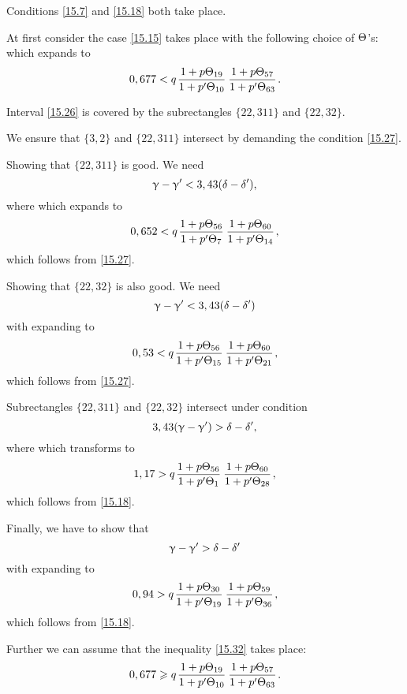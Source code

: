 Conditions \ref{15.7} and \ref{15.18} both take place.

At first consider the case \ref{15.15} takes place with the following choice of $\Theta$'s:
which expands to
\begin{equation}\label{15.27}
	0,677 < q \up{19}{10} \up{57}{63}.
\end{equation}

Interval \ref{15.26} is covered by the subrectangles $\{22, 311\}$ and $\{22, 32\}$.

We ensure that $\{3, 2\}$ and $\{22, 311\}$ intersect by demanding the condition \ref{15.27}.

Showing that $\{22, 311\}$ is good. We need
\begin{equation}
	\upgamma - \upgamma' < 3,43(\delta - \delta'),
\end{equation}
where
which expands to
\begin{equation}
	0,652 < q \up{56}{7} \up{60}{14},
\end{equation}
which follows from \ref{15.27}.

Showing that $\{22, 32\}$ is also good. We need
\begin{equation*}
	\upgamma - \upgamma' < 3,43 (\delta - \delta')
\end{equation*}
with
expanding to
\begin{equation}\label{15.29}
	0,53 < q \up{56}{15} \up{60}{21},
\end{equation}
which follows from \ref{15.27}.

Subrectangles $\{22, 311\}$ and $\{22, 32\}$ intersect under condition
\begin{equation}
	3,43 (\upgamma - \upgamma') > \delta - \delta',
\end{equation}
where
which transforms to
\begin{equation}\label{15.30}
	1,17 > q \up{56}{1} \up{60}{28},
\end{equation}
which follows from \ref{15.18}.

Finally, we have to show that
\begin{equation*}
	\upgamma - \upgamma' > \delta - \delta'
\end{equation*}
with
expanding to
\begin{equation}
	0,94 > q \up{30}{19} \up{59}{36},
\end{equation}
which follows from \ref{15.18}.

Further we can assume that the inequality \ref{15.32} takes place:
\begin{equation}\label{15.32}
	0,677 \geqslant q \up{19}{10} \up{57}{63}.
\end{equation}

